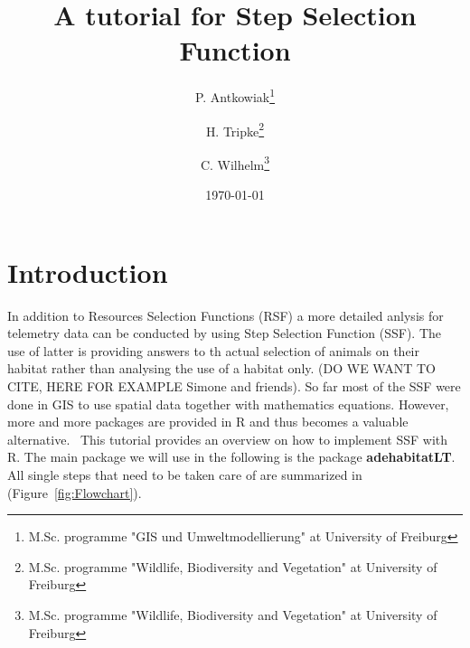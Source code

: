\documentclass[11pt, a4paper]{article}\usepackage[]{graphicx}\usepackage[]{color}
\begin{document}



\title{A tutorial for Step Selection Function}

\author{P. Antkowiak\thanks{M.Sc. programme "GIS und Umweltmodellierung" at University of Freiburg} \and H. Tripke\thanks{M.Sc. programme "Wildlife, Biodiversity and Vegetation" at University of Freiburg} \and C. Wilhelm\thanks{M.Sc. programme "Wildlife, Biodiversity and Vegetation" at University of Freiburg}}

\date{\today} %

\maketitle


\tableofcontents

\newpage

\section{Introduction}%
In addition to Resources Selection Functions (RSF) a more detailed anlysis for telemetry data can be conducted by using Step Selection Function (SSF). The use of latter is providing answers to th actual selection of animals on their habitat rather than analysing the use of a habitat only. (DO WE WANT TO CITE, HERE FOR EXAMPLE Simone and friends). So far most of the SSF were done in GIS to use spatial data together with mathematics equations. However, more and more packages are provided in R and thus becomes a valuable alternative. \
This tutorial provides an overview on how to implement SSF with R. The main package we will use in the following is the package \textbf{adehabitatLT}. All single steps that need to be taken care of are summarized in (Figure~\ref{fig:Flowchart}).
\end{document}
